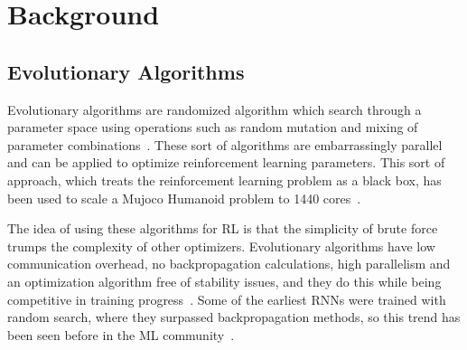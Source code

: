
\section{Background}
\subsection{Evolutionary Algorithms}
Evolutionary algorithms are randomized algorithm which search through a parameter space using operations such as random mutation and mixing of parameter combinations~\cite{man1996genetic}.
These sort of algorithms are embarrassingly parallel and can be applied to optimize reinforcement learning parameters.
This sort of approach, which treats the reinforcement learning problem as a black box, has been used to scale a Mujoco Humanoid problem to 1440 cores~\cite{salimans2017evolution}.

The idea of using these algorithms for RL is that the simplicity of brute force trumps the complexity of other optimizers.
Evolutionary algorithms have low communication overhead, no backpropagation calculations, high parallelism and an optimization algorithm free of stability issues, and they do this while being competitive in training progress~\cite{salimans2017evolution}.
Some of the earliest RNNs were trained with random search, where they surpassed backpropagation methods, so this trend has been seen before in the ML community~\cite{hochreiter1997long}.

\label{sec:background}